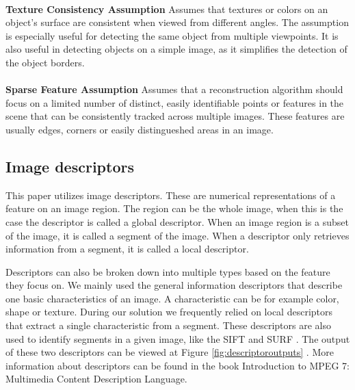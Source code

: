 \paragraph{}

\textbf{Texture Consistency Assumption} Assumes that textures or colors on an object’s surface are consistent when viewed from different angles. The assumption is especially useful for detecting the same object from multiple viewpoints. It is also useful in detecting objects on a simple image, as it simplifies the detection of the object borders.

\paragraph{}

\textbf{Sparse Feature Assumption} Assumes that a reconstruction algorithm should focus on a limited number of distinct, easily identifiable points or features in the scene that can be consistently tracked across multiple images. These features are usually edges, corners or easily distingueshed areas in an image.

\subsection{Image descriptors}
This paper utilizes image descriptors. These are numerical representations of a feature on an image region. The region can be the whole image, when this is the case the descriptor is called a global descriptor. When an image region is a subset of the image, it is called a segment of the image. When a descriptor only retrieves information from a segment, it is called a local descriptor.

Descriptors can also be broken down into multiple types based on the feature they focus on. We mainly used the general information descriptors that describe one basic characteristics of an image. A characteristic can be for example color, shape or texture. During our solution we frequently relied on local descriptors that extract a single characteristic from a segment. These descriptors are also used to identify segments in a given image, like the SIFT \cite{lowe2004distinctive} and SURF \cite{speeduprobustfeatures}. The output of these two descriptors can be viewed at Figure \ref{fig:descriptoroutputs} . More information about descriptors can be found in the book Introduction to MPEG 7: Multimedia Content Description Language\cite{manjunath2002mpeg7}.

